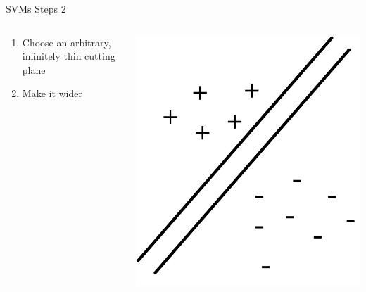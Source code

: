 \documentclass[aspectratio=169]{beamer}
\begin{document}
\begin{frame}{SVMs Steps 2}

\begin{columns}[T]
\begin{column}{0.6\textwidth}
\begin{enumerate}
\item  Choose an arbitrary, infinitely thin cutting plane
\item Make it wider
\end{enumerate}
\end{column}
\begin{column}{0.4\textwidth}
\includegraphics[width=1\textwidth]{lectSVM/svm2}
\end{column}
\end{columns}
\end{frame}
\end{document}
